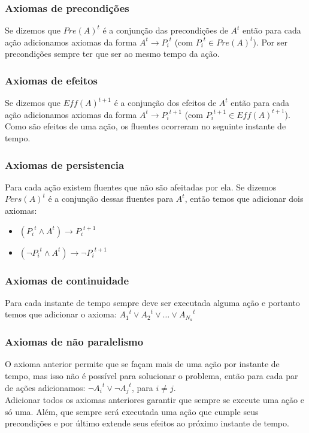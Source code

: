 	\subsubsection{Axiomas de precondições}
		Se dizemos que ${Pre}( A )^t$ é a conjunção das precondições de $A^t$ então para cada ação adicionamos axiomas da forma $A^t \to {P_i}^t$ (com ${P_i}^t\in Pre( A )^t$). Por ser precondições sempre ter que ser ao mesmo tempo da ação.
	\subsubsection{Axiomas de efeitos}
		Se dizemos que ${Eff}( A )^{t+1}$ é a conjunção dos efeitos de $A^t$ então para cada ação adicionamos axiomas da forma $A^t \to {P_i}^{t+1}$ (com ${P_i}^{t+1} \in Eff( A )^{t+1}$). Como são efeitos de uma ação, os fluentes ocorreram no seguinte instante de tempo.
	\subsubsection{Axiomas de persistencia}
		Para cada ação existem fluentes que não são afeitadas por ela. Se dizemos $Pers( A )^t$ é a conjunção dessas fluentes para $A^t$, então temos que adicionar dois axiomas:
		\begin{itemize}
			\item $( {P_i}^t \land A^t ) \to {P_i}^{t+1}$
			\item $( \lnot {P_i}^t \land A^t ) \to \lnot {P_i}^{t+1}$
		\end{itemize}
	\subsubsection{Axiomas de continuidade}
		Para cada instante de tempo sempre deve ser executada alguma ação e portanto temos que adicionar o axioma:
		${A_1}^t \lor {A_2}^t \lor \ldots \lor {A_{N_a}}^t$
	\subsubsection{Axiomas de não paralelismo}
		O axioma anterior permite que se façam mais de uma ação por instante de tempo, mas isso não é possível para solucionar o problema, então para cada par de ações adicionamos:
		$\lnot {A_i}^t \lor \lnot {A_j}^t$, para $i \neq j$.\\
	Adicionar todos os axiomas anteriores garantir que sempre se execute uma ação e só uma. Além, que sempre será executada uma ação que cumple seus precondições e por último extende seus efeitos ao próximo instante de tempo.
	
